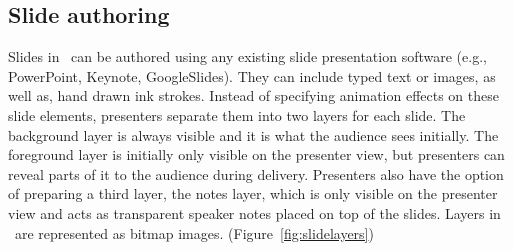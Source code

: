 \subsection{Slide authoring}
Slides in \interface\ can be authored using any existing slide presentation software (e.g., PowerPoint, Keynote, GoogleSlides). They can include typed text or images, as well as, hand drawn ink strokes. Instead of specifying animation effects on these slide elements, presenters separate them into two layers for each slide. The background layer is always visible and it is what the audience sees initially. The foreground layer is initially only visible on the presenter view, but presenters can reveal parts of it to the audience during delivery. Presenters also have the option of preparing a third layer, the notes layer, which is only visible on the presenter view and acts as transparent speaker notes placed on top of the slides. Layers in \interface\ are represented as bitmap images. (Figure~\ref{fig:slidelayers})

